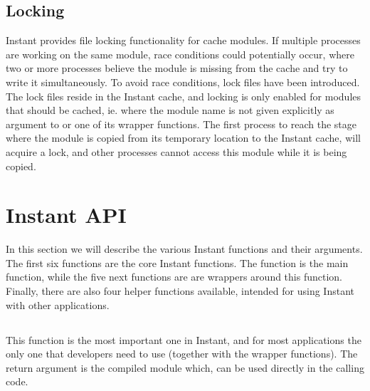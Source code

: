 \subsection{Locking}
Instant provides file locking functionality for cache modules. If multiple
processes are working on the same module, race conditions could potentially
occur, where two or more processes believe the module is missing from the cache
and try to write it simultaneously. To avoid race conditions, lock files have been  
introduced. The lock files reside in the Instant cache, and locking is only
enabled for modules that should be cached, ie. where the module name is not
given explicitly as argument to  or one of its wrapper
functions. The first process to reach the stage where the module is copied
from its temporary location to the Instant cache, will acquire a lock, and
other processes cannot access this module while it is being copied.



\section{Instant API}
\label{wilbers:sec:api}
In this section we will describe the various Instant functions and their
arguments. The first six functions are the core Instant
functions. The function  is the main function, while 
the five next functions are are wrappers around this function. Finally, there are also four 
helper functions available, intended for using Instant with other
applications.


\subsection[build\_module]{}
This function is the most important one in Instant, and for most applications
the only one that developers need to use (together with the wrapper functions). 
The return argument is the compiled module which,
can be used directly in the calling code. 

